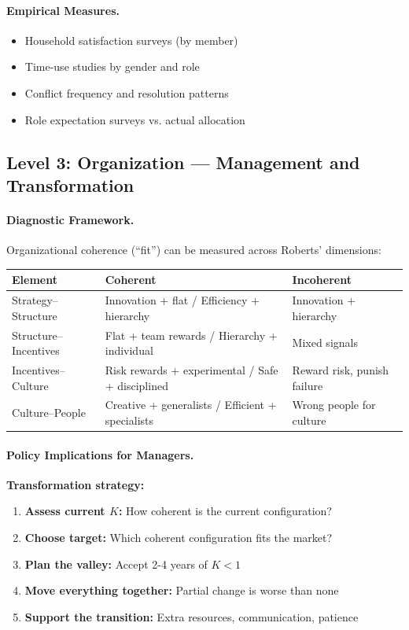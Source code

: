 \documentclass[12pt,a4paper]{article}
\begin{document}
\paragraph{Empirical Measures.}
\begin{itemize}
  \item Household satisfaction surveys (by member)
  \item Time-use studies by gender and role
  \item Conflict frequency and resolution patterns
  \item Role expectation surveys vs. actual allocation
\end{itemize}

\subsection{Level 3: Organization --- Management and Transformation}

\paragraph{Diagnostic Framework.}
Organizational coherence (``fit'') can be measured across Roberts' dimensions:

\begin{center}
\renewcommand{\arraystretch}{1.2}
\begin{tabular}{lll}
\hline
\textbf{Element} & \textbf{Coherent} & \textbf{Incoherent} \\
\hline
Strategy--Structure & Innovation + flat / Efficiency + hierarchy & Innovation + hierarchy \\
Structure--Incentives & Flat + team rewards / Hierarchy + individual & Mixed signals \\
Incentives--Culture & Risk rewards + experimental / Safe + disciplined & Reward risk, punish failure \\
Culture--People & Creative + generalists / Efficient + specialists & Wrong people for culture \\
\hline
\end{tabular}
\end{center}

\paragraph{Policy Implications for Managers.}
\textbf{Transformation strategy:}
\begin{enumerate}
  \item \textbf{Assess current $K$:} How coherent is the current configuration?
  \item \textbf{Choose target:} Which coherent configuration fits the market?
  \item \textbf{Plan the valley:} Accept 2-4 years of $K < 1$
  \item \textbf{Move everything together:} Partial change is worse than none
  \item \textbf{Support the transition:} Extra resources, communication, patience
\end{enumerate}
\end{document}
